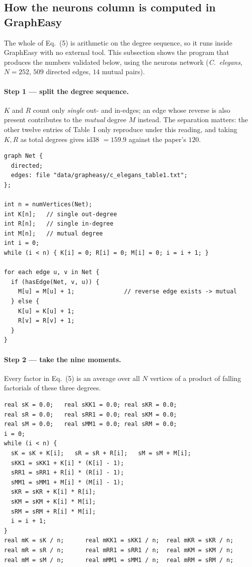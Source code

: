 \documentclass[11pt]{article}
\begin{document}
\subsection{How the neurons column is computed in GraphEasy}

The whole of Eq.~(5) is arithmetic on the degree sequence, so it runs inside
GraphEasy with no external tool. This subsection shows the program that
produces the numbers validated below, using the neurons network
(\textit{C.\ elegans}, $N=252$, $509$ directed edges, $14$ mutual pairs).

\paragraph{Step 1 --- split the degree sequence.}
$K$ and $R$ count only \emph{single} out- and in-edges; an edge whose reverse
is also present contributes to the \emph{mutual} degree $M$ instead. The
separation matters: the other twelve entries of Table~I only reproduce under
this reading, and taking $K,R$ as total degrees gives id38 $=159.9$ against the
paper's $120$.

\begin{lstlisting}
graph Net {
  directed;
  edges: file "data/grapheasy/c_elegans_table1.txt";
};

int n = numVertices(Net);
int K[n];   // single out-degree
int R[n];   // single in-degree
int M[n];   // mutual degree
int i = 0;
while (i < n) { K[i] = 0; R[i] = 0; M[i] = 0; i = i + 1; }

for each edge u, v in Net {
  if (hasEdge(Net, v, u)) {
    M[u] = M[u] + 1;              // reverse edge exists -> mutual
  } else {
    K[u] = K[u] + 1;
    R[v] = R[v] + 1;
  }
}
\end{lstlisting}

\paragraph{Step 2 --- take the nine moments.}
Every factor in Eq.~(5) is an average over all $N$ vertices of a product of
falling factorials of these three degrees.

\begin{lstlisting}
real sK = 0.0;   real sKK1 = 0.0; real sKR = 0.0;
real sR = 0.0;   real sRR1 = 0.0; real sKM = 0.0;
real sM = 0.0;   real sMM1 = 0.0; real sRM = 0.0;
i = 0;
while (i < n) {
  sK = sK + K[i];   sR = sR + R[i];   sM = sM + M[i];
  sKK1 = sKK1 + K[i] * (K[i] - 1);
  sRR1 = sRR1 + R[i] * (R[i] - 1);
  sMM1 = sMM1 + M[i] * (M[i] - 1);
  sKR = sKR + K[i] * R[i];
  sKM = sKM + K[i] * M[i];
  sRM = sRM + R[i] * M[i];
  i = i + 1;
}
real mK = sK / n;      real mKK1 = sKK1 / n;  real mKR = sKR / n;
real mR = sR / n;      real mRR1 = sRR1 / n;  real mKM = sKM / n;
real mM = sM / n;      real mMM1 = sMM1 / n;  real mRM = sRM / n;
\end{lstlisting}
\end{document}
